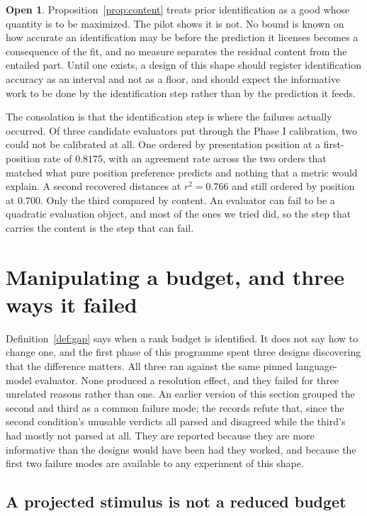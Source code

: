 \documentclass[11pt,letterpaper]{article}
\theoremstyle{plain}
\theoremstyle{definition}
\newtheorem{open}[theorem]{Open}
\begin{document}
\begin{open}
\label{open:band}
Proposition~\ref{prop:content} treats prior identification as a good whose
quantity is to be maximized. The pilot shows it is not. No bound is known on how
accurate an identification may be before the prediction it licenses becomes a
consequence of the fit, and no measure separates the residual content from the
entailed part. Until one exists, a design of this shape should register
identification accuracy as an interval and not as a floor, and should expect the
informative work to be done by the identification step rather than by the
prediction it feeds.
\end{open}

The consolation is that the identification step is where the failures actually
occurred. Of three candidate evaluators put through the Phase I calibration,
two could not be calibrated at all. One ordered by presentation position at a
first-position rate of $0.8175$, with an agreement rate across the two orders
that matched what pure position preference predicts and nothing that a metric
would explain. A second recovered distances at $r^2 = 0.766$ and still ordered
by position at $0.700$. Only the third compared by content. An evaluator can
fail to be a quadratic evaluation object, and most of the ones we tried did, so
the step that carries the content is the step that can fail.

\section{Manipulating a budget, and three ways it failed}
\label{sec:manip}

Definition~\ref{def:gap} says when a rank budget is identified. It does not say
how to change one, and the first phase of this programme spent three designs
discovering that the difference matters. All three ran against the same pinned
language-model evaluator. None produced a resolution effect, and they failed for
three unrelated reasons rather than one. An earlier version of this section
grouped the second and third as a common failure mode; the records refute that,
since the second condition's unusable verdicts all parsed and disagreed while the
third's had mostly not parsed at all. They are reported because they are more
informative than the designs would have been had they worked, and because the
first two failure modes are available to any experiment of this shape.

\subsection*{A projected stimulus is not a reduced budget}
\end{document}
